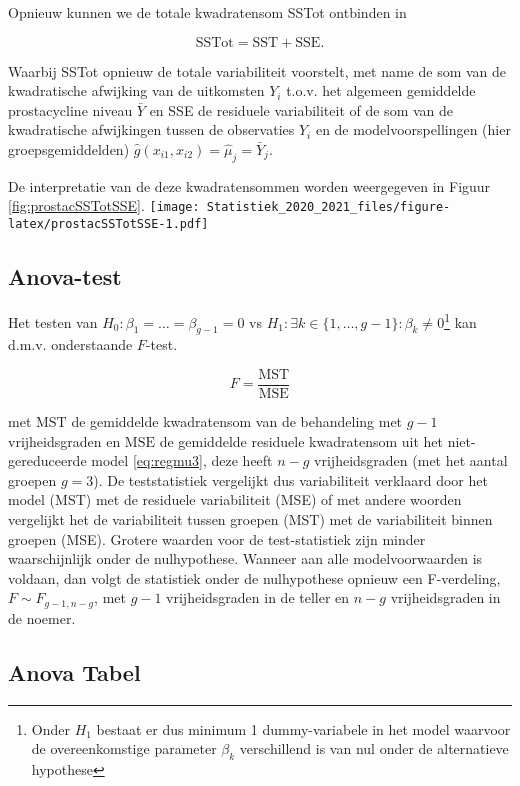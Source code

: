 \documentclass[
  12pt,dutch,coursenotes]{book}
\theoremstyle{definition}
\theoremstyle{definition}
\theoremstyle{definition}
\theoremstyle{remark}
\begin{document}
Opnieuw kunnen we de totale kwadratensom SSTot ontbinden in

\[\text{SSTot} = \text{SST} + \text{SSE}.\]

Waarbij SSTot opnieuw de totale variabiliteit voorstelt, met name de som van de kwadratische afwijking van de uitkomsten \(Y_{i}\) t.o.v. het algemeen gemiddelde prostacycline niveau \(\bar{Y}\) en SSE de residuele variabiliteit of de som van de kwadratische afwijkingen tussen de observaties \(Y_{i}\) en de modelvoorspellingen (hier groepsgemiddelden) \(\hat{g}(x_{i1},x_{i2})=\hat \mu_j=\bar Y_j\).

De interpretatie van de deze kwadratensommen worden weergegeven in Figuur \ref{fig:prostacSSTotSSE}.
\texttt{[image: Statistiek\_2020\_2021\_files/figure-latex/prostacSSTotSSE-1.pdf]}

\hypertarget{anova-test}{%
\subsection{Anova-test}\label{anova-test}}

Het testen van \(H_0: \beta_1=\ldots=\beta_{g-1}=0\) vs \(H_1: \exists k \in\{1,\ldots,g-1\} : \beta_k \neq0\)\footnote{Onder \(H_1\) bestaat er dus minimum 1 dummy-variabele in het model waarvoor de overeenkomstige parameter \(\beta_k\) verschillend is van nul onder de alternatieve hypothese} kan d.m.v. onderstaande \(F\)-test.

\[F = \frac{\text{MST}}{\text{MSE}}\]

met \(\text{MST}\) de gemiddelde kwadratensom van de behandeling met \(g-1\) vrijheidsgraden en \(\text{MSE}\) de gemiddelde residuele kwadratensom uit het niet-gereduceerde model \eqref{eq:regmu3}, deze heeft \(n-g\) vrijheidsgraden (met het aantal groepen \(g=3\)).
De teststatistiek vergelijkt dus variabiliteit verklaard door het model (MST) met de residuele variabiliteit (MSE) of met andere woorden vergelijkt het de
variabiliteit tussen groepen (MST) met de variabiliteit binnen groepen (MSE).
Grotere waarden voor de test-statistiek zijn minder waarschijnlijk onder de nulhypothese.
Wanneer aan alle modelvoorwaarden is voldaan, dan volgt de statistiek onder de nulhypothese opnieuw een F-verdeling, \(F \sim F_{g-1,n-g}\), met \(g-1\) vrijheidsgraden in de teller en \(n-g\) vrijheidsgraden in de noemer.

\hypertarget{anova-tabel-1}{%
\subsection{Anova Tabel}\label{anova-tabel-1}}
\end{document}
